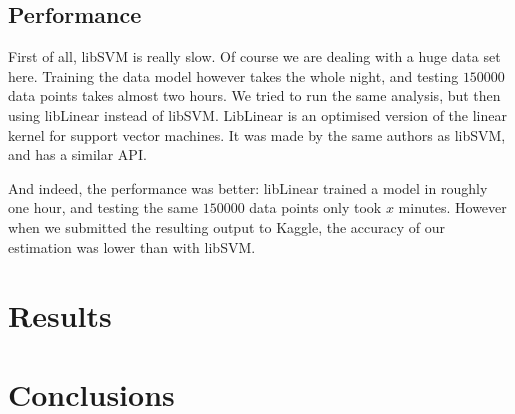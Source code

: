 \documentclass[a4paper]{article}
\begin{document}
\subsection{Performance}
First of all, libSVM is really slow. Of course we are dealing with a huge data set here. Training the data model however takes the whole night, and testing $150000$ data points takes almost two hours. We tried to run the same analysis, but then using libLinear instead of libSVM. LibLinear is an optimised version of the linear kernel for support vector machines. It was made by the same authors as libSVM, and has a similar API.

And indeed, the performance was better: libLinear trained a model in roughly one hour, and testing the same $150000$ data points only took $x$ minutes. However when we submitted the resulting output to Kaggle, the accuracy of our estimation was lower than with libSVM.

\section{Results}


\section{Conclusions}
\end{document}
